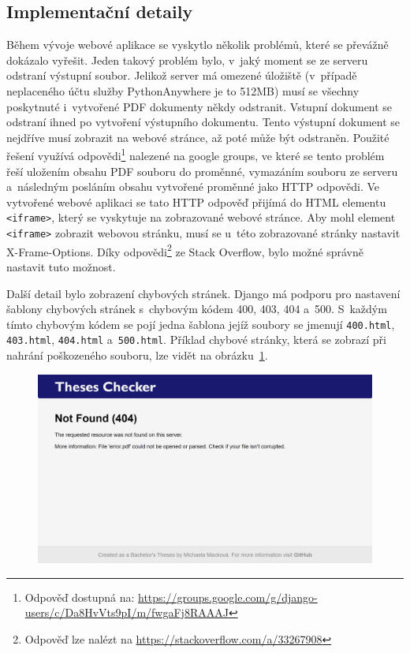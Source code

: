 \subsection*{Implementační detaily}
Během vývoje webové aplikace se vyskytlo několik problémů, které se převážně
dokázalo vyřešit. Jeden takový problém bylo, v~jaký moment se ze serveru odstraní
výstupní soubor. Jelikož server má omezené úložiště (v~případě neplaceného účtu
služby PythonAnywhere je to 512\;MB) musí se všechny poskytnuté i~vytvořené PDF
dokumenty někdy odstranit. Vstupní dokument se odstraní ihned po vytvoření
výstupního dokumentu. Tento výstupní dokument se nejdříve musí zobrazit na
webové stránce, až poté může být odstraněn. Použité řešení využívá
odpovědi\footnote{
    Odpověď dostupná na:
    \href{https://groups.google.com/g/django-users/c/Da8HvVts9pI/m/fwgaFj8RAAAJ}{https://groups.google.com/g/django-users/c/Da8HvVts9pI/m/fwgaFj8RAAAJ}
} nalezené na google groups, ve které se tento problém řeší uložením
obsahu PDF souboru do proměnné, vymazáním souboru ze serveru a~následným posláním 
obsahu vytvořené proměnné jako HTTP odpovědi. Ve vytvořené webové aplikaci se tato
HTTP odpověď přijímá do HTML elementu \texttt{<iframe>}, který se vyskytuje na
zobrazované webové stránce. Aby mohl element \texttt{<iframe>} zobrazit webovou
stránku, musí se u~této zobrazované stránky nastavit X-Frame-Options. Díky
odpovědi\footnote{
    Odpověď lze nalézt na 
    \href{https://stackoverflow.com/a/33267908}{https://stackoverflow.com/a/33267908}
} ze Stack Overflow, bylo možné správně nastavit tuto možnost. 

Další detail bylo zobrazení chybových stránek. Django má podporu pro nastavení
šablony chybových stránek s~chybovým kódem 400, 403, 404 a~500. S~každým tímto
chybovým kódem se pojí jedna šablona jejíž soubory se jmenují \texttt{400.html},
\texttt{403.html}, \texttt{404.html} a~\texttt{500.html}. Příklad chybové
stránky, která se zobrazí při nahrání poškozeného souboru, lze vidět na
obrázku~\ref{pic_theses_checker_error}.

\begin{figure}[H]
    \centering
    \includegraphics[width=\linewidth]{obrazky-figures/screenshot-error.png}
    \caption{}
    \label{pic_theses_checker_error}
\end{figure}



